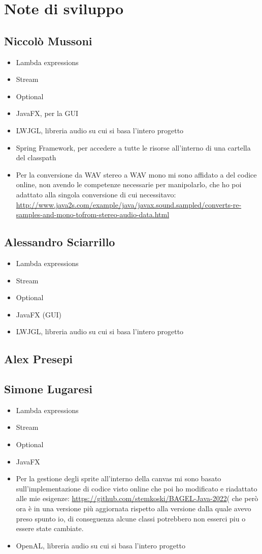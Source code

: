 \documentclass[a4paper,12pt]{report}
\begin{document}
\section{Note di sviluppo}
\subsection*{Niccolò Mussoni}
\begin{itemize}
	\item Lambda expressions
	\item Stream
	\item Optional
	\item JavaFX, per la GUI
	\item LWJGL, libreria audio su cui si basa l’intero progetto
	\item Spring Framework, per accedere a tutte le risorse all’interno di una cartella del classpath
	\item Per la conversione da WAV stereo a WAV mono mi sono affidato a del codice online, non avendo le competenze necessarie per manipolarlo, che ho poi adattato alla singola conversione di cui necessitavo: \url{http://www.java2s.com/example/java/javax.sound.sampled/converts-re-samples-and-mono-tofrom-stereo-audio-data.html}
\end{itemize}
\subsection*{Alessandro Sciarrillo}
\begin{itemize}
	\item Lambda expressions
	\item Stream
	\item Optional
	\item JavaFX (GUI)
	\item LWJGL, libreria audio su cui si basa l’intero progetto

\end{itemize}
\subsection*{Alex Presepi}
\subsection*{Simone Lugaresi}
\begin{itemize}
	\item Lambda expressions
	\item Stream
	\item Optional
	\item JavaFX
	\item Per la gestione degli sprite all'interno della canvas mi sono basato sull'implementazione di codice visto online che poi ho modificato e riadattato alle mie esigenze: \url{https://github.com/stemkoski/BAGEL-Java-2022}( che però ora è in una versione più aggiornata rispetto alla versione dalla quale avevo preso spunto io, di conseguenza alcune classi potrebbero non esserci piu o essere state cambiate.
	\item OpenAL, libreria audio su cui si basa l’intero progetto
\end{itemize}
\end{document}
